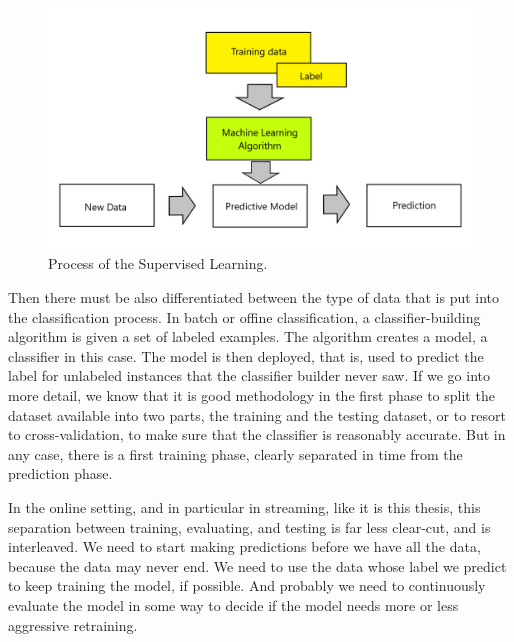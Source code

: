 \documentclass[12pt,oneside,a4paper,parskip]{scrbook}
\begin{document}
\pagebreak

\begin{figure}
  \includegraphics[width=\linewidth]{SL_process_figure}
  \caption{Process of the Supervised Learning. \cite{PythonML}}
  \label{fig:sl_process}
\end{figure}

Then there must be also differentiated between the type of data that is put into the classification process.
In batch or offine classification, a classifier-building algorithm is given a set of labeled examples. 
The algorithm creates a model, a classifier in this case. The model is then deployed, that is, used to predict the label 
for unlabeled instances that the classifier builder never saw. If we go into more detail, we know that it is good 
methodology in the first phase to split the dataset available into two parts, the training and the testing dataset, 
or to resort to cross-validation, to make sure that the classifier is reasonably accurate.
But in any case, there is a first training phase, clearly separated in time from the prediction phase.

In the online setting, and in particular in streaming, like it is this thesis, this separation between training, 
evaluating, and testing is far less clear-cut, and is interleaved. We need to start making predictions before we have all 
the data, because the data may never end. We need to use the data whose label we predict to keep training the model, 
if possible. And probably we need to continuously evaluate the model in some way to decide if the model needs more or 
less aggressive retraining. \cite{MLonDataStreams}

\pagebreak
\end{document}
